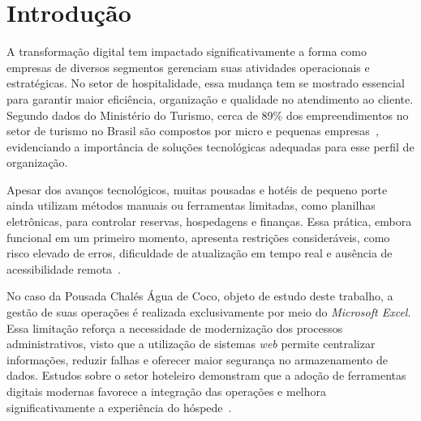 \documentclass[
	12pt,				%
	openany,			%
	oneside,			%
	a4paper,			%
	english,			%
	french,				%
	spanish,			%
	brazil				%
	]{abntex2}
\renewcommand*{\cleardoublepage}{\clearpage}
\begin{document}
\tableofcontents*
\cleardoublepage



\textual

\chapter{Introdução}

A transformação digital tem impactado significativamente a forma como empresas de diversos segmentos gerenciam suas atividades operacionais e estratégicas. No setor de hospitalidade, essa mudança tem se mostrado essencial para garantir maior eficiência, organização e qualidade no atendimento ao cliente. Segundo dados do Ministério do Turismo, cerca de 89\% dos empreendimentos no setor de turismo no Brasil são compostos por micro e pequenas empresas~\cite{mtur}, evidenciando a importância de soluções tecnológicas adequadas para esse perfil de organização.

Apesar dos avanços tecnológicos, muitas pousadas e hotéis de pequeno porte ainda utilizam métodos manuais ou ferramentas limitadas, como planilhas eletrônicas, para controlar reservas, hospedagens e finanças. Essa prática, embora funcional em um primeiro momento, apresenta restrições consideráveis, como risco elevado de erros, dificuldade de atualização em tempo real e ausência de acessibilidade remota~\cite{gestaopro}.

No caso da Pousada Chalés Água de Coco, objeto de estudo deste trabalho, a gestão de suas operações é realizada exclusivamente por meio do \textit{Microsoft Excel}. Essa limitação reforça a necessidade de modernização dos processos administrativos, visto que a utilização de sistemas \textit{web} permite centralizar informações, reduzir falhas e oferecer maior segurança no armazenamento de dados. Estudos sobre o setor hoteleiro demonstram que a adoção de ferramentas digitais modernas favorece a integração das operações e melhora significativamente a experiência do hóspede~\cite{totvs}.
\end{document}
